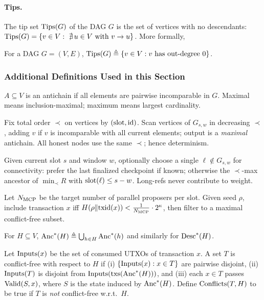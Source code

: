 \paragraph{Tips.} The tip set $\mathrm{Tips}(G)$ of the DAG $G$ is the set of vertices with no descendants: $\mathrm{Tips}(G)=\{v\in V:\ \nexists\,u\in V \text{ with } v\to u\}$. More formally, 

\begin{definition}[Tips]
For a DAG $G=(V,E)$, $\mathrm{Tips}(G)\triangleq\{v\in V:\text{$v$ has out-degree $0$}\}$.
\end{definition}

\subsubsection*{Additional Definitions Used in this Section}

\begin{definition}
$A\subseteq V$ is an antichain if all elements are pairwise incomparable in $G$. Maximal means inclusion-maximal; maximum means largest cardinality.
\end{definition}
\begin{definition}[\GreedyAntichain\ on $G_{s,w}$]
Fix total order $\prec$ on vertices by $(\mathrm{slot},\mathrm{id})$. Scan vertices of $G_{s,w}$ in decreasing $\prec$, adding $v$ if $v$ is incomparable with all current elements; output is a \emph{maximal} antichain. All honest nodes use the same $\prec$; hence determinism.
\end{definition}
\begin{definition}[\OptionalLongRef]
Given current slot $s$ and window $w$, optionally choose a single $\ell\notin G_{s,w}$ for connectivity: prefer the last finalized checkpoint if known; otherwise the $\prec$-max ancestor of $\min_{\prec}R$ with $\mathrm{slot}(\ell)\le s-w$. Long-refs never contribute to weight.
\end{definition}
\begin{definition}[\SampleMempool]
Let $N_{\mathrm{MCP}}$ be the target number of parallel proposers per slot. Given seed $\rho$, include transaction $x$ iff 
$H(\rho\|\mathrm{txid}(x))<\tfrac{1}{N_{\mathrm{MCP}}}\cdot 2^\kappa$, then filter to a maximal conflict-free subset.
\end{definition}
\begin{definition}
For $H\subseteq V$, $\mathrm{Anc}^*(H)\triangleq \bigcup_{h\in H}\mathrm{Anc}^*(h)$ and similarly for $\mathrm{Desc}^*(H)$.
\end{definition}
\begin{definition}
Let $\mathrm{Inputs}(x)$ be the set of consumed UTXOs of transaction $x$. A set $T$ is conflict-free with respect to $H$ if (i) $\{\mathrm{Inputs}(x):x\in T\}$ are pairwise disjoint,
(ii) $\mathrm{Inputs}(T)$ is disjoint from $\mathrm{Inputs}(\mathrm{txs}(\mathrm{Anc}^*(H)))$, and (iii) each $x\in T$ passes $\mathrm{Valid}(S,x)$, where $S$ is the state induced by $\mathrm{Anc}^*(H)$. Define $\mathrm{Conflicts}(T,H)$ to be true if $T$ is \emph{not} conflict-free w.r.t.\ $H$.
\end{definition}

